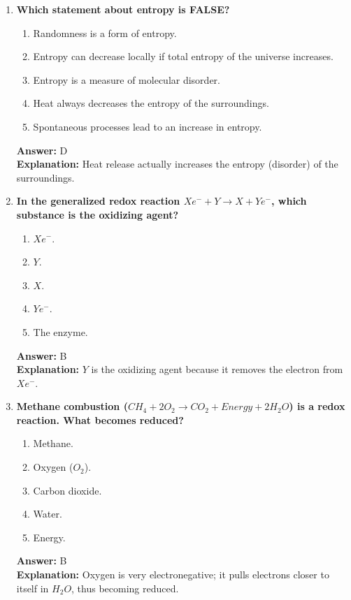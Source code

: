 \documentclass[11pt, a4paper]{article}
\begin{document}
\begin{enumerate}[leftmargin=*, label=\arabic*.]
\item \textbf{Which statement about entropy is FALSE?}
\begin{enumerate}[label=\Alph*.]
    \item Randomness is a form of entropy.
    \item Entropy can decrease locally if total entropy of the universe increases.
    \item Entropy is a measure of molecular disorder.
    \item Heat always decreases the entropy of the surroundings.
    \item Spontaneous processes lead to an increase in entropy.
\end{enumerate}
\textbf{Answer:} D \\
\textbf{Explanation:} Heat release actually increases the entropy (disorder) of the surroundings.

\item \textbf{In the generalized redox reaction $Xe^- + Y \rightarrow X + Ye^-$, which substance is the oxidizing agent?}
\begin{enumerate}[label=\Alph*.]
    \item $Xe^-$.
    \item $Y$.
    \item $X$.
    \item $Ye^-$.
    \item The enzyme.
\end{enumerate}
\textbf{Answer:} B \\
\textbf{Explanation:} $Y$ is the oxidizing agent because it removes the electron from $Xe^-$.

\item \textbf{Methane combustion ($CH_4 + 2 O_2 \rightarrow CO_2 + Energy + 2 H_2O$) is a redox reaction. What becomes reduced?}
\begin{enumerate}[label=\Alph*.]
    \item Methane.
    \item Oxygen ($O_2$).
    \item Carbon dioxide.
    \item Water.
    \item Energy.
\end{enumerate}
\textbf{Answer:} B \\
\textbf{Explanation:} Oxygen is very electronegative; it pulls electrons closer to itself in $H_2O$, thus becoming reduced.


\end{enumerate}
\end{document}
